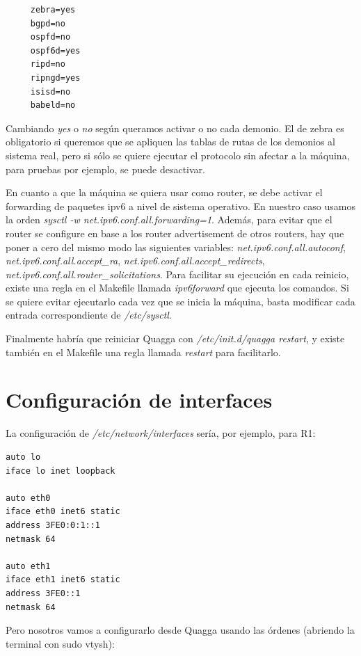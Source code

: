 \documentclass{article}
\begin{document}
 \begin{verbatim}
	 zebra=yes
	 bgpd=no
	 ospfd=no
	 ospf6d=yes
	 ripd=no
	 ripngd=yes
	 isisd=no
	 babeld=no
 \end{verbatim}

 Cambiando \textit{yes} o \textit{no} según queramos activar o no cada demonio. El de zebra es obligatorio si queremos que se apliquen las tablas de rutas de los demonios al sistema real, pero si sólo se quiere ejecutar el protocolo sin afectar a la máquina, para pruebas por ejemplo, se puede desactivar.

 En cuanto a que la máquina se quiera usar como router, se debe activar el forwarding de paquetes ipv6 a nivel de sistema operativo. En nuestro caso usamos la orden \textit{sysctl -w net.ipv6.conf.all.forwarding=1}. Además, para evitar que el router se configure en base a los router advertisement de otros routers, hay que poner a cero del mismo modo las siguientes variables: \textit{net.ipv6.conf.all.autoconf}, \textit{net.ipv6.conf.all.accept\_ra}, \textit{net.ipv6.conf.all.accept\_redirects}, \textit{net.ipv6.conf.all.router\_solicitations}. Para facilitar su ejecución en cada reinicio, existe una regla en el Makefile llamada \textit{ipv6forward} que ejecuta los comandos. Si se quiere evitar ejecutarlo cada vez que se inicia la máquina, basta modificar cada entrada correspondiente de \textit{/etc/sysctl}.


 Finalmente habría que reiniciar Quagga con \textit{/etc/init.d/quagga restart}, y existe también en el Makefile una regla llamada \textit{restart} para facilitarlo.
 
\section{Configuración de interfaces}

La configuración de \textit{/etc/network/interfaces} sería, por ejemplo, para R1:

\begin{BVerbatim}
auto lo
iface lo inet loopback

auto eth0
iface eth0 inet6 static
address 3FE0:0:1::1
netmask 64

auto eth1
iface eth1 inet6 static
address 3FE0::1
netmask 64
\end{BVerbatim}

\hfill


Pero nosotros vamos a configurarlo desde Quagga usando las órdenes (abriendo la terminal con sudo vtysh):
\end{document}

